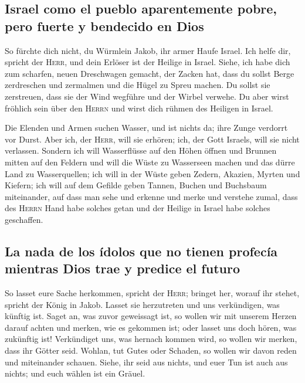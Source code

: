 \hypertarget{israel-como-el-pueblo-aparentemente-pobre-pero-fuerte-y-bendecido-en-dios}{%
\subsection{Israel como el pueblo aparentemente pobre, pero fuerte y
bendecido en
Dios}\label{israel-como-el-pueblo-aparentemente-pobre-pero-fuerte-y-bendecido-en-dios}}

 So fürchte dich nicht, du Würmlein Jakob, ihr armer
Haufe Israel. Ich helfe dir, spricht der \textsc{Herr}, und dein Erlöser
ist der Heilige in Israel.  Siehe, ich habe dich zum
scharfen, neuen Dreschwagen gemacht, der Zacken hat, dass du sollst
Berge zerdreschen und zermalmen und die Hügel zu Spreu machen.
 Du sollst sie zerstreuen, dass sie der Wind wegführe und
der Wirbel verwehe. Du aber wirst fröhlich sein über den \textsc{Herrn}
und wirst dich rühmen des Heiligen in Israel.

 Die Elenden und Armen suchen Wasser, und ist nichts da;
ihre Zunge verdorrt vor Durst. Aber ich, der \textsc{Herr}, will sie
erhören; ich, der Gott Israels, will sie nicht verlassen.
 Sondern ich will Wasserflüsse auf den Höhen öffnen und
Brunnen mitten auf den Feldern und will die Wüste zu Wasserseen machen
und das dürre Land zu Wasserquellen;  ich will in der
Wüste geben Zedern, Akazien, Myrten und Kiefern; ich will auf dem
Gefilde geben Tannen, Buchen und Buchsbaum miteinander, 
auf dass man sehe und erkenne und merke und verstehe zumal, dass des
\textsc{Herrn} Hand habe solches getan und der Heilige in Israel habe
solches geschaffen.

\hypertarget{la-nada-de-los-uxeddolos-que-no-tienen-profecuxeda-mientras-dios-trae-y-predice-el-futuro}{%
\subsection{La nada de los ídolos que no tienen profecía mientras Dios
trae y predice el
futuro}\label{la-nada-de-los-uxeddolos-que-no-tienen-profecuxeda-mientras-dios-trae-y-predice-el-futuro}}

 So lasset eure Sache herkommen, spricht der
\textsc{Herr}; bringet her, worauf ihr stehet, spricht der König in
Jakob.  Lasset sie herzutreten und uns verkündigen, was
künftig ist. Saget an, was zuvor geweissagt ist, so wollen wir mit
unserem Herzen darauf achten und merken, wie es gekommen ist; oder
lasset uns doch hören, was zukünftig ist!  Verkündiget
uns, was hernach kommen wird, so wollen wir merken, dass ihr Götter
seid. Wohlan, tut Gutes oder Schaden, so wollen wir davon reden und
miteinander schauen.  Siehe, ihr seid aus nichts, und
euer Tun ist auch aus nichts; und euch wählen ist ein Gräuel.


